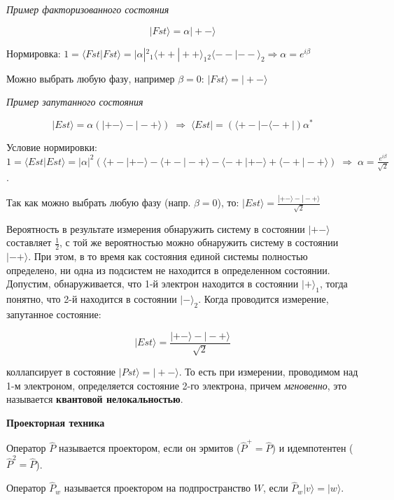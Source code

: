 \documentclass[__main__.tex]{subfiles}
\begin{document}
\textit{Пример факторизованного состояния}

$$|Fst\rangle = \alpha |+-\rangle$$

Нормировка: $1 = \langle Fst | Fst \rangle  = | \alpha |^2 {}_1 \langle + + | + + \rangle_1 {}_2 \langle - - | - - \rangle_2 \Rightarrow \alpha = e^{i\beta}$

Можно выбрать любую фазу, например $\beta = 0$: $|Fst\rangle = |+-\rangle$

\textit{Пример запутанного состояния}

$$|Est\rangle = \alpha \left(|+-\rangle - |-+\rangle\right) \; \Rightarrow \; \langle Est | = \left(\langle + - | - \langle - + |\right) \alpha^{*}$$

Условие нормировки: $1 = \langle Est | Est \rangle  = | \alpha |^2 \left( \langle + - | + - \rangle - \langle + - | - + \rangle - \langle - + | + - \rangle + \langle - + | - + \rangle \right) \; \Rightarrow \; \alpha = \frac{e^{i\beta}}{\sqrt{2}}$.

Так как можно выбрать любую фазу (напр. $\beta = 0$), то: $|Est\rangle = \frac{|+-\rangle - |-+\rangle}{\sqrt{2}}$

Вероятность в результате измерения обнаружить систему в состоянии $|+-\rangle$ составляет $\frac{1}{2}$, с той же вероятностью можно обнаружить систему в состоянии $|-+\rangle$. При этом, в то время как состояния единой системы полностью определено, ни одна из подсистем не находится в определенном состоянии.\\

Допустим, обнаруживается, что 1-й электрон находится в состоянии $|+\rangle_1$, тогда понятно, что 2-й находится в состоянии $|-\rangle_2$. Когда проводится измерение, запутанное состояние:

$$|Est\rangle = \frac{|+-\rangle - |-+\rangle}{\sqrt{2}}$$

коллапсирует в состояние $|Pst\rangle = |+-\rangle$. То есть при измерении, проводимом над 1-м электроном, определяется состояние 2-го электрона, причем \textit{мгновенно}, это называется \textbf{квантовой нелокальностью}.

\textbf{Проекторная техника}

\begin{definition}
Оператор $\hat{P}$ называется проектором, если он эрмитов ($\hat{P}^+ = \hat{P}$) и идемпотентен ($\hat{P}^2 = \hat{P}$).
\end{definition}

\begin{definition}
Оператор $\hat{P}_w$ называется проектором на подпространство $W$, если $\hat{P}_w |v\rangle = |w\rangle$.
\end{definition}
\end{document}
